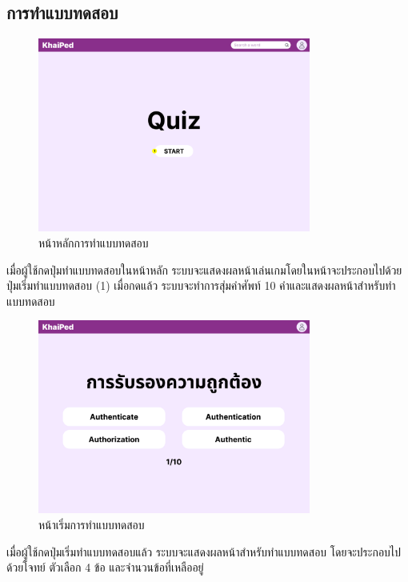 \documentclass[12pt,oneside,openright,a4paper]{cpe-thai-project}
\begin{document}
\subsection{การทำแบบทดสอบ}
\begin{figure}[!h]\centering
	\includegraphics[width=0.8\textwidth, keepaspectratio=true]{image/chap3/ui/quiz/Quiz.png}
	\caption{หน้าหลักการทำแบบทดสอบ}\label{fig:UI_Quiz}
\end{figure}
\hspace{1cm}
เมื่อผู้ใช้กดปุ่มทำแบบทดสอบในหน้าหลัก ระบบจะแสดงผลหน้าเล่นเกมโดยในหน้าจะประกอบไปด้วยปุ่มเริ่มทำแบบทดสอบ (1) เมื่อกดแล้ว ระบบจะทำการสุ่มคำศัพท์ 10 คำและแสดงผลหน้าสำหรับทำแบบทดสอบ

\pagebreak
\begin{figure}[!h]\centering
	\includegraphics[width=0.8\textwidth, keepaspectratio=true]{image/chap3/ui/quiz/Quiz - Start.png}
	\caption{หน้าเริ่มการทำแบบทดสอบ}\label{fig:UI_QuizStart}
\end{figure}
\hspace{1cm}
เมื่อผู้ใช้กดปุ่มเริ่มทำแบบทดสอบแล้ว ระบบจะแสดงผลหน้าสำหรับทำแบบทดสอบ โดยจะประกอบไปด้วยโจทย์ ตัวเลือก 4 ข้อ และจำนวนข้อที่เหลืออยู่
\end{document}
